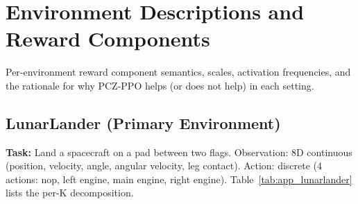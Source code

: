 \documentclass[11pt,a4paper]{article}
\begin{document}
\section{Environment Descriptions and Reward Components}

Per-environment reward component semantics, scales, activation frequencies, and the rationale for why PCZ-PPO helps (or does not help) in each setting.

\subsection{LunarLander (Primary Environment)}

\textbf{Task:} Land a spacecraft on a pad between two flags. Observation: 8D continuous (position, velocity, angle, angular velocity, leg contact). Action: discrete (4 actions: nop, left engine, main engine, right engine). Table~\ref{tab:app_lunarlander} lists the per-K decomposition.
\end{document}
